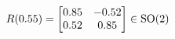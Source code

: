 \documentclass[preview]{standalone}
\begin{document}
\begin{align*}
\special{dvisvgm:raw <g id='unique000'>}R(0.55) = \begin{bmatrix} 0.85 & -0.52 \\ 0.52 & 0.85 \end{bmatrix} \in \text{SO}(2)\special{dvisvgm:raw </g>}
\end{align*}
\end{document}
